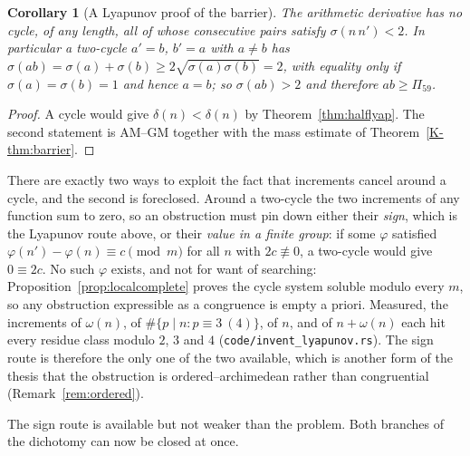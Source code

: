 \documentclass[11pt]{article}
\newtheorem{corollary}[theorem]{Corollary}
\theoremstyle{definition}
\begin{document}
\begin{corollary}[A Lyapunov proof of the barrier]\label{cor:lyapbarrier}
The arithmetic derivative has no cycle, of any length, all of whose consecutive pairs satisfy
$\sigma(n\,n')<2$. In particular a two-cycle $a'=b$, $b'=a$ with $a\neq b$ has
$\sigma(ab)=\sigma(a)+\sigma(b)\ge2\sqrt{\sigma(a)\sigma(b)}=2$, with equality only if
$\sigma(a)=\sigma(b)=1$ and hence $a=b$; so $\sigma(ab)>2$ and therefore $ab\ge\Pi_{59}$.
\end{corollary}
\begin{proof}
A cycle would give $\delta(n)<\delta(n)$ by Theorem~\ref{thm:halflyap}. The second statement is
AM--GM together with the mass estimate of Theorem~\ref{K-thm:barrier}.
\end{proof}

There are exactly two ways to exploit the fact that increments cancel around a cycle, and the
second is foreclosed. Around a two-cycle the two increments of any function sum to zero, so an
obstruction must pin down either their \emph{sign}, which is the Lyapunov route above, or their
\emph{value in a finite group}: if some $\varphi$ satisfied
$\varphi(n')-\varphi(n)\equiv c\pmod m$ for all $n$ with $2c\not\equiv0$, a two-cycle would give
$0\equiv2c$. No such $\varphi$ exists, and not for want of searching:
Proposition~\ref{prop:localcomplete} proves the cycle system soluble modulo every $m$, so any
obstruction expressible as a congruence is empty a priori. Measured, the increments of
$\omega(n)$, of $\#\{p\mid n:p\equiv3\ (4)\}$, of $n$, and of $n+\omega(n)$ each hit every residue
class modulo $2$, $3$ and $4$ \textup{(\texttt{code/invent\_lyapunov.rs})}. The sign route is
therefore the only one of the two available, which is another form of the thesis that the
obstruction is ordered--archimedean rather than congruential (Remark~\ref{rem:ordered}).

The sign route is available but not weaker than the problem. Both branches of the
dichotomy can now be closed at once.
\end{document}

